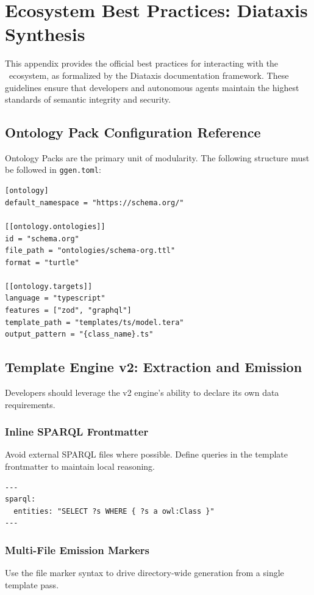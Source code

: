 \chapter{Ecosystem Best Practices: Diataxis Synthesis}

This appendix provides the official best practices for interacting with the \ggen\ ecosystem, as formalized by the Diataxis documentation framework. These guidelines ensure that developers and autonomous agents maintain the highest standards of semantic integrity and security.

\section{Ontology Pack Configuration Reference}

Ontology Packs are the primary unit of modularity. The following structure must be followed in \texttt{ggen.toml}:

\begin{verbatim}
[ontology]
default_namespace = "https://schema.org/"

[[ontology.ontologies]]
id = "schema.org"
file_path = "ontologies/schema-org.ttl"
format = "turtle"

[[ontology.targets]]
language = "typescript"
features = ["zod", "graphql"]
template_path = "templates/ts/model.tera"
output_pattern = "{class_name}.ts"
\end{verbatim}

\section{Template Engine v2: Extraction and Emission}

Developers should leverage the v2 engine's ability to declare its own data requirements.

\subsection{Inline SPARQL Frontmatter}
Avoid external SPARQL files where possible. Define queries in the template frontmatter to maintain local reasoning.

\begin{verbatim}
---
sparql:
  entities: "SELECT ?s WHERE { ?s a owl:Class }"
---
\end{verbatim}

\subsection{Multi-File Emission Markers}
Use the file marker syntax to drive directory-wide generation from a single template pass.

